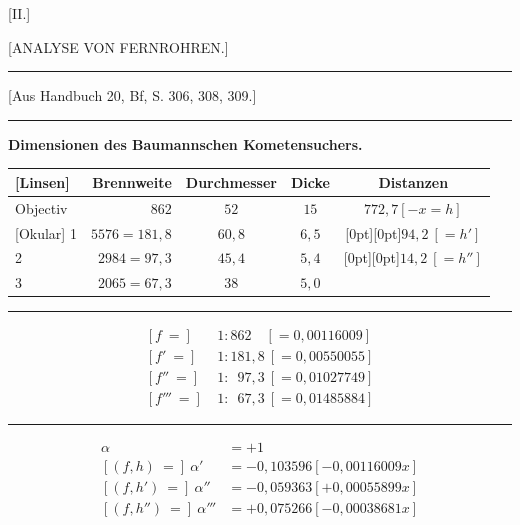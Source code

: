 \clearpage\begingroup
\NoSourceHead{}
\begin{center}
[II.]\par\medskip
{\large [ANALYSE VON FERNROHREN.]}\par\medskip
\rule{.55\linewidth}{.4pt}\par
{\small [Aus Handbuch 20, Bf, S. 306, 308, 309.]}\par
\rule{.55\linewidth}{.4pt}\par\bigskip
[A.]\par\medskip
\textbf{Dimensionen des Baumannschen Kometensuchers.}
\end{center}
\begin{center}\small
\setlength{\tabcolsep}{5pt}\renewcommand{\arraystretch}{1.45}
\begin{tabular}{l|r|c|c|c}
\hline\hline
{}[Linsen]&Brennweite&Durchmesser&Dicke&Distanzen\\
\hline\hline
Objectiv&$862$&$52$&$15$&$772{,}7[-x=h]$\\
{}[Okular] 1&$5576=181{,}8$&$60{,}8$&$6{,}5$&\raisebox{-.5\normalbaselineskip}[0pt][0pt]{$94{,}2\ [=h']$}\\
\hfill 2&$2984=97{,}3$&$45{,}4$&$5{,}4$&\raisebox{-.5\normalbaselineskip}[0pt][0pt]{$14{,}2\ [=h'']$}\\
\hfill 3&$2065=67{,}3$&$38$&$5{,}0$&
\end{tabular}
\end{center}
\noindent\rule{\linewidth}{.4pt}
\[
\begin{aligned}
[f\ ={}]&\ 1:862\quad[=0{,}00116009]\\
{}[f'\ ={}]&\ 1:181{,}8\ [=0{,}00550055]\\
{}[f''\ ={}]&\ 1:\phantom{1}97{,}3\ [=0{,}01027749]\\
{}[f'''\ ={}]&\ 1:\phantom{1}67{,}3\ [=0{,}01485884]
\end{aligned}
\]
\noindent\rule{\linewidth}{.4pt}
\[
\begin{aligned}
\alpha&=+1\\
{}[(f,h)\ ={}]\ \alpha'&=-0{,}103596[-0{,}00116009x]\\
{}[(f,h')\ ={}]\ \alpha''&=-0{,}059363[+0{,}00055899x]\\
{}[(f,h'')\ ={}]\ \alpha'''&=+0{,}075266[-0{,}00038681x]
\end{aligned}
\]

